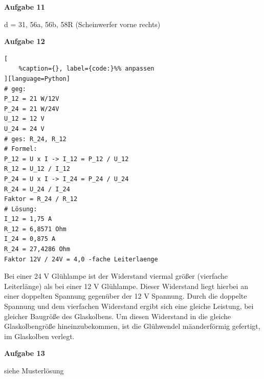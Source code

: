 \textbf{Aufgabe 11}

d = 31, 56a, 56b, 58R (Scheinwerfer vorne rechts)

\newpage

\textbf{Aufgabe 12}

\lstset{language=Python}%
\begin{lstlisting}[
	%caption={}, label={code:}%% anpassen
][language=Python]
# geg:
P_12 = 21 W/12V
P_24 = 21 W/24V
U_12 = 12 V
U_24 = 24 V
# ges: R_24, R_12
# Formel:
P_12 = U x I -> I_12 = P_12 / U_12
R_12 = U_12 / I_12
P_24 = U x I -> I_24 = P_24 / U_24
R_24 = U_24 / I_24
Faktor = R_24 / R_12
# Lösung:
I_12 = 1,75 A
R_12 = 6,8571 Ohm
I_24 = 0,875 A
R_24 = 27,4286 Ohm
Faktor 12V / 24V = 4,0 -fache Leiterlaenge
\end{lstlisting}

Bei einer 24 V Glühlampe ist der Widerstand viermal größer (vierfache
Leiterlänge) als bei einer 12 V Glühlampe. Dieser Widerstand liegt
hierbei an einer doppelten Spannung gegenüber der 12 V Spannung. Durch
die doppelte Spannung und dem vierfachen Widerstand ergibt sich eine
gleiche Leistung, bei gleicher Baugröße des Glaskolbens. Um diesen
Widerstand in die gleiche Glaskolbengröße hineinzubekommen, ist die
Glühwendel mäanderförmig gefertigt, im Glaskolben verlegt.

\textbf{Aufgabe 13}

siehe Musterlösung
